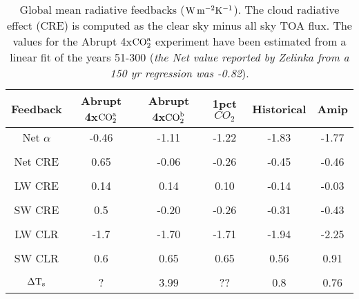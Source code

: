 \documentclass[draft]{agujournal2019}
\begin{document}
\begin{table}
\begin{center}
\caption{Global mean radiative feedbacks ($\rm{W\, m^{-2} K^{-1}}$).  The cloud radiative effect (CRE) is computed as
 the clear sky minus all sky TOA flux.  The values for the Abrupt 4x$\rm{CO}_2^{a}$ experiment
have been estimated from a linear fit of the years 51-300 (\textit{the Net value reported by Zelinka from a 150 yr regression was -0.82}).}
    \begin{tabular}{*{6}{c}}
    \hline
    \hline
 Feedback   &    Abrupt 4x$\rm{CO}_2^{a}$   &  Abrupt 4x$\rm{CO}_2^{b}$  & 1pct$CO_2$   & Historical    &  Amip   \\ \hline
    Net $\alpha$    &     -0.46     &   -1.11      &  -1.22          &  -1.83         & -1.77               \\ 
    \\
    Net CRE  &    0.65    & -0.06       &  -0.26          & -0.45         & -0.46           \\  
    \\
    LW CRE    &   0.14       & 0.14        &  0.10            & -0.14           & -0.03          \\  
    \\
    SW CRE  &    0.5     &    -0.20       &  -0.26            & -0.31          & -0.43         \\  
    \\
    LW CLR   &   -1.7     &  -1.70       &  -1.71            & -1.94           & -2.25        \\  
    \\
    SW CLR  &      0.6         &   0.65        & 0.65              & 0.56             & 0.91          \\  
    \\
    $\Delta \rm{T}_s$     &     ?     & 3.99        &  ??                & 0.8              & 0.76          \\  \hline

    \end{tabular}\par
    \label{tab:lambdahist}
\end{center}
\end{table}
\end{document}
